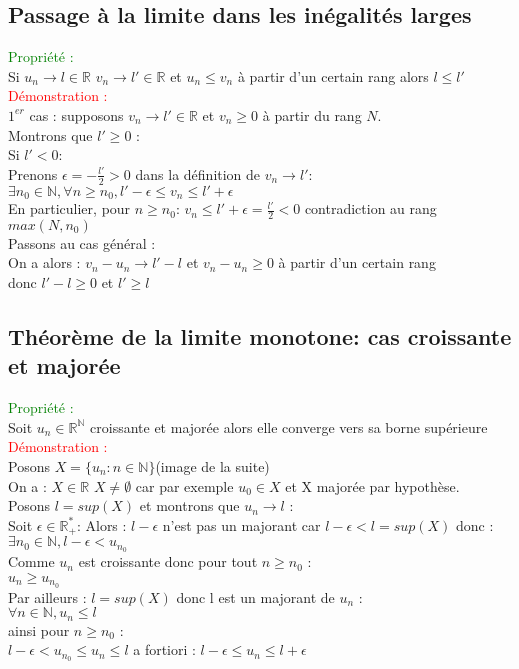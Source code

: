\documentclass{article}
\begin{document}
\subsection{Passage à la limite dans les inégalités larges}
\textcolor{green}{Propriété :} \\ 
Si $u_n \rightarrow l \in \mathbb{R} $ $v_n \rightarrow l' \in \mathbb{R}$ et $u_n \leq v_n$ à partir d'un certain rang alors $l \leq l'$ \\ 
\textcolor{red}{Démonstration :} \\ 
$1^{er}$ cas : supposons $v_n \rightarrow l' \in \mathbb{R}$ et $v_n \geq 0$ à partir du rang $N$. \\ 
Montrons que $ l' \geq 0$ : \\ 
Si $l' <0$: \\ 
Prenons $\epsilon= -\frac{l'}{2}>0$ dans la définition de $v_n \rightarrow l'$: \\ 
$\exists n_0 \in \mathbb{N}, \forall n \geq n_0, l'- \epsilon \leq v_n \leq l'+ \epsilon$ \\ 
En particulier, pour $n \geq n_0$: $v_n \leq l'+ \epsilon=\frac{l'}{2}<0$ contradiction au rang $max(N,n_0)$ \\ 
Passons au cas général : \\ 
On a alors : $v_n-u_n \rightarrow l'-l$ et $v_n-u_n \geq 0$ à partir d'un certain rang \\ 
donc $l'-l\geq 0$ et $l' \geq l$
\subsection{Théorème de la limite monotone: cas croissante et majorée}
\textcolor{green}{Propriété :} \\ 
Soit $u_n \in \mathbb{R}^\mathbb{N}$ croissante  et majorée alors elle converge vers sa borne supérieure \\ 
\textcolor{red}{Démonstration :} \\ 
Posons $X=\lbrace u_n : n \in \mathbb{N} \rbrace$(image de la suite) \\ 
On a : $X \in \mathbb{R}$ $X\neq \emptyset$ car par exemple $u_0 \in X$ et X majorée par hypothèse. \\ 
Posons $l=sup(X)$ et montrons que $u_n \rightarrow l$ : \\ 
Soit $\epsilon \in \mathbb{R}^*_+$:
Alors : $l- \epsilon $ n'est pas un majorant car $l - \epsilon <l=sup(X)$ donc : \\ 
$\exists n_0 \in \mathbb{N}, l- \epsilon < u_{n_0}$ \\ 
Comme $u_n$ est croissante donc pour tout $n \geq n_0$ : \\ 
$u_n \geq u_{n_0}$ \\ 
Par ailleurs : $l=sup(X)$ donc l est un majorant de $u_n$ : \\ 
$\forall n \in \mathbb{N},u_n \leq l$ \\ 
ainsi pour $n \geq n_0$ : \\ 
$l- \epsilon < u_{n_0} \leq u_n \leq l$
a fortiori : $l- \epsilon  \leq u_n \leq l+ \epsilon$
\end{document}
